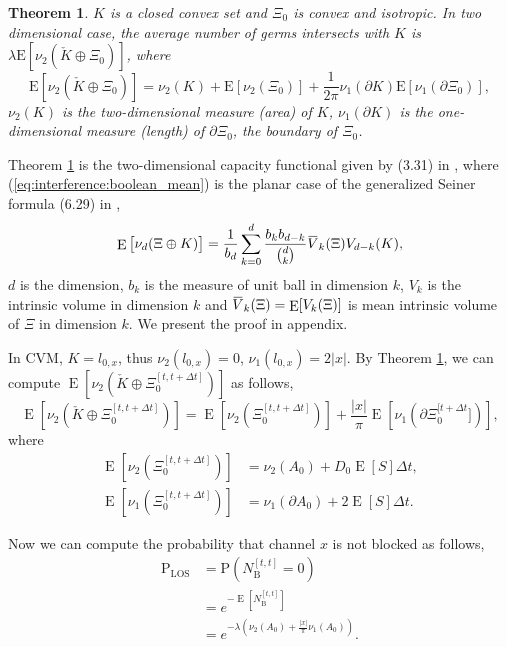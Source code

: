 \documentclass[10pt, conference, letterpaper]{IEEEtran}
\newtheorem{theorem}{Theorem}
\DeclareMathOperator*{\E}{\mathrm{E}}
\newcommand{\overbar}[1]{\mkern 1.5mu\overline{\mkern-1.5mu#1\mkern-1.5mu}\mkern 1.5mu}
\begin{document}
\begin{theorem}\label{theorem:boolean_mean}
$K$ is a closed convex set and $\Xi_0$ is convex and isotropic. In two dimensional case, the average number of germs intersects  with $K$ is $\lambda\mathrm{E}[\nu_2(\check{K}\oplus \Xi_0)]$, where 
\begin{equation}\label{eq:interference:boolean_mean}
\mathrm{E}[\nu_2(\check{K}\oplus \Xi_0)] = \nu_2(K) + \mathrm{E}[\nu_2(\Xi_0)] + \frac{1}{2\pi}\nu_1(\partial K)\mathrm{E}[\nu_1(\partial \Xi_0)],
\end{equation}
$\nu_2(K)$ is the two-dimensional measure (area) of $K$, $\nu_1(\partial K)$ is the one-dimensional measure (length) of $\partial \Xi_0$, the boundary of $\Xi_0$.
\end{theorem}
Theorem \ref{theorem:boolean_mean} is the two-dimensional capacity functional given by (3.31) in \cite{stochasticapp}, where (\ref{eq:interference:boolean_mean}) is the planar case of the generalized Seiner formula (6.29) in \cite{stochasticapp},  
\begin{equation*}
\E\big[\nu_d(\Xi\oplus K)\big] = \frac{1}{b_d}\sum\limits_{k=0}^{d}\frac{b_k b_{d-k}}{{d \choose k}}\overbar{V}_k(\Xi) V_{d-k}(K),
\end{equation*}
$d$ is the dimension, $b_k$ is the measure of unit ball in dimension $k$, $V_k$ is the intrinsic volume in dimension $k$ and $\overbar{V}_k(\Xi) = \E[V_k(\Xi)]$ is mean intrinsic volume of $\Xi$ in dimension $k$. We present the proof in appendix.

In CVM, $K = l_{0,x}$, thus $\nu_2(l_{0,x}) = 0$, $\nu_1(l_{0,x}) = 2|x|$.
By Theorem \ref{theorem:boolean_mean}, we can compute $\E[\nu_2(\check{K}\oplus\Xi_0^{[t, t+\Delta t]})]$ as follows,
\begin{equation}\label{eq:boolean_mean}
\E[\nu_2(\check{K}\oplus\Xi_0^{[t, t+\Delta t]})] = \E[\nu_2(\Xi_0^{[t, t+\Delta t]})] + \frac{|x|}{\pi}\E[\nu_1(\partial \Xi_0^{[t + \Delta t}])],
\end{equation}
where
\begin{equation*}
\begin{split}
\E[\nu_2(\Xi_0^{[t, t+\Delta t]})] & = \nu_2(A_0) + D_0\E[S]\Delta t,\\
\E[\nu_1(\Xi_0^{[t, t+\Delta t]})] & = \nu_1(\partial A_0) + 2\E[S]\Delta t.
\end{split}
\end{equation*}

Now we can compute the probability that channel $x$ is not blocked as follows, 
\begin{equation}\label{eq:P_LOS}
\begin{aligned}
\mathrm{P}_{\mathrm{LOS}} & = \mathrm{P}(N_{\mathrm{B}}^{[t, t]}=0)  \\
& = e^{-\E[N_\mathrm{B}^{[t,t]}]} \\
& = e^{-\lambda(\nu_2(A_0) + \frac{|x|}{\pi}\nu_1(A_0))}. 
\end{aligned}
\end{equation}
\end{document}
